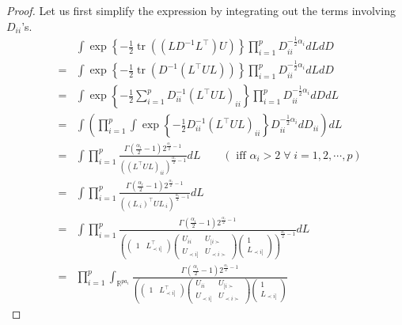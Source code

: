 \documentclass[12pt]{article}
\newcommand{\R}{\mathbb{R}}
\DeclareMathOperator{\tr}{tr}
\theoremstyle{plain}
\theoremstyle{definition}
\theoremstyle{remark}
\begin{document}
\begin{proof}Let us first simplify the expression by integrating out the terms involving  $D_{ii}$'s.
\begin{eqnarray*}
& & \int \exp\left\{- \frac{1}{2}\tr \left(\left(LD^{-1}L^{\top}\right) U \right) \right\}\prod^{p}_{i=1}D_{ii}^{-\frac{1}{2}\alpha_i} dL dD\\
&=& \int \exp\left\{-\frac{1}{2} \tr \left( D^{-1}\left( L^{\top}U L\right) \right)\right\}
\prod_{i=1}^{p}  D^{-\frac{1}{2}\alpha_i}_{ii} dL dD\\
&=& \int \exp\left\{- \frac{1}{2}\sum^{p}_{i=1}D^{-1}_{ii}( L^{\top} U L)_{ii}\right\}
\prod^{p}_{i=1}D_{ii}^{-\frac{1}{2}\alpha_i} dD dL\\
&=& \int\left( \prod_{i=1}^{p} \int\exp\left\{- \frac{1}{2}D^{-1}_{ii}( L^{\top} U L)_{ii}\right\}
D_{ii}^{-\frac{1}{2}\alpha_i} dD_{ii}\right) dL\\
&=& \int \prod_{i=1}^{p} \frac{\Gamma \left( \frac{\alpha_i}{2} - 1 \right)
2^{\frac{\alpha_i}{2} - 1}}{\left( \left( L^{\top} U L \right)_{ii}
\right)^{\frac{\alpha_i}{2} - 1}} dL \qquad(\text{ iff  } \alpha_i > 2 \; \forall \; i =
1, 2, \cdots, p)\\
&=& \int \prod_{i=1}^{p} \frac{\Gamma \left( \frac{\alpha_i}{2} - 1 \right)
2^{\frac{\alpha_i}{2} - 1}}{\left( (L_{\cdot i })^{\top} U L_{\cdot i}
\right)^{\frac{\alpha_i}{2} - 1}} dL\\
&=& \int \prod_{i=1}^{p} \frac{\Gamma \left( \frac{\alpha_i}{2} - 1 \right)
2^{\frac{\alpha_i}{2} - 1}}{\left(\left(\begin{matrix}1& L^{\top}_{\prec i]}\end{matrix}\right)\left(\begin{matrix}U_{ii}& U_{[i\succ}\\U_{\prec i]}& U_{\prec i\succ}\end{matrix}\right) \left(\begin{matrix} 1\\ L_{\prec i]} \end{matrix}\right)
\right)^{\frac{\alpha_i}{2} - 1}} dL\\
&=& \prod_{i=1}^{p} \int_{\R^{pa_i}} \frac{\Gamma \left( \frac{\alpha_i}{2} - 1 \right)
2^{\frac{\alpha_i}{2} - 1}}{\left(\left(\begin{matrix}1& L^{\top}_{\prec i]}\end{matrix}\right)\left(\begin{matrix}U_{ii}& U_{[i\succ}\\U_{\prec i]}& U_{\prec i\succ}\end{matrix}\right) \left(\begin{matrix} 1\\ L_{\prec i]} \end{matrix}\right)
}
\end{eqnarray*}
\end{proof}
\end{document}
